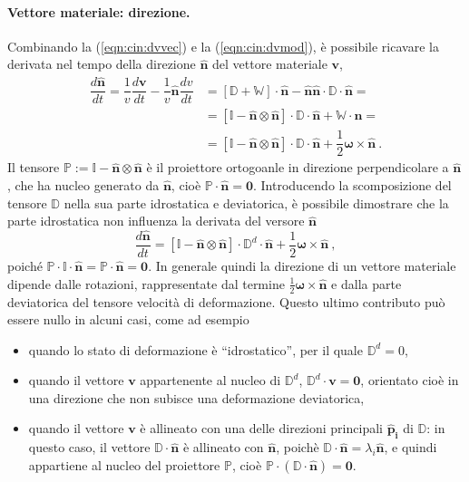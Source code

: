 \paragraph{Vettore materiale: direzione.}
Combinando la (\ref{eqn:cin:dvvec}) e la (\ref{eqn:cin:dvmod}), è possibile ricavare la derivata nel tempo della direzione $\bm{\hat{n}}$ del vettore materiale $\bm{v}$,
\begin{equation}
\begin{aligned}
 \dfrac{d \bm{\hat{n}}}{d t} = \dfrac{1}{v}\dfrac{d\bm{v}}{dt} - \dfrac{1}{v} \bm{\hat{n}} \dfrac{d v}{d t}  & = [ \mathbb{D} + \mathbb{W} ] \cdot \bm{\hat{n}} - \bm{\hat{n}} \bm{\hat{n}} \cdot \mathbb{D} \cdot \bm{\hat{n}} = \\
   & =  [ \mathbb{I} - \bm{\hat{n}} \otimes \bm{\hat{n}} ] \cdot \mathbb{D} \cdot \bm{\hat{n}} + \mathbb{W} \cdot \bm{\hat{n}} = \\
   & = [ \mathbb{I} - \bm{\hat{n}} \otimes \bm{\hat{n}} ] \cdot \mathbb{D} \cdot \bm{\hat{n}} + \dfrac{1}{2} \bm{\omega} \times \bm{\hat{n}} \ .
\end{aligned}
\end{equation}
Il tensore $\mathbb{P} := \mathbb{I} - \bm{\hat{n}} \otimes \bm{\hat{n}}$ è il proiettore ortogoanle in direzione perpendicolare a $\bm{\hat{n}}$, che ha nucleo generato da $\bm{\hat{n}}$, cioè $\mathbb{P} \cdot \bm{\hat{n}} = \bm{0}$. Introducendo la scomposizione del tensore $\mathbb{D}$ nella sua parte idrostatica e deviatorica, è possibile dimostrare che la parte idrostatica non influenza la derivata del versore $\bm{\hat{n}}$ 
\begin{equation}
 \dfrac{d \bm{\hat{n}}}{d t} = [ \mathbb{I} - \bm{\hat{n}} \otimes \bm{\hat{n}} ] \cdot \mathbb{D}^d \cdot \bm{\hat{n}} + \dfrac{1}{2} \bm{\omega} \times \bm{\hat{n}} \ ,
\end{equation}
 poiché $\mathbb{P} \cdot \mathbb{I} \cdot \bm{\hat{n}} = \mathbb{P} \cdot \bm{\hat{n}} = \bm{0}$. In generale quindi la direzione di un vettore materiale dipende dalle rotazioni, rappresentate dal termine $\frac{1}{2} \bm{\omega} \times \bm{\hat{n}}$ e dalla parte deviatorica del tensore velocità di deformazione. Questo ultimo contributo può essere nullo in alcuni casi, come ad esempio
 \begin{itemize}
  \item quando lo stato di deformazione è ``idrostatico'', per il quale $\mathbb{D}^d = 0$,
  \item quando il vettore $\bm{v}$ appartenente al nucleo di $\mathbb{D}^d$, $\mathbb{D}^d \cdot \bm{v} = \bm{0}$, orientato cioè in una direzione che non subisce una deformazione deviatorica,
  \item quando il vettore $\bm{v}$ è allineato con una delle direzioni principali $\bm{\hat{p}_i}$ di         $\mathbb{D}$: in questo caso, il vettore $\mathbb{D} \cdot \bm{\hat{n}}$ è allineato con $\bm{\hat{n}}$, poichè $\mathbb{D} \cdot \bm{\hat{n}} = \lambda_i \bm{\hat{n}}$, e quindi appartiene al nucleo del proiettore $\mathbb{P}$, cioè $\mathbb{P} \cdot (\mathbb{D} \cdot \bm{\hat{n}}) = \bm{0}$.
 \end{itemize}
 
